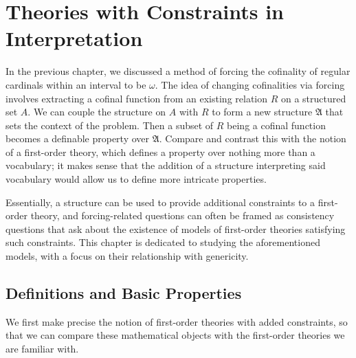 \documentclass[12pt, twoside]{memoir}
\numberwithin{equation}{section}
\theoremstyle{definition}
\theoremstyle{remark}
\theoremstyle{definition}
\theoremstyle{definition}
\theoremstyle{definition}
\theoremstyle{remark}
\begin{document}
\chapter{Theories with Constraints in Interpretation}\label{TCIsec}

In the previous chapter, we discussed a method of forcing the cofinality of regular cardinals within an interval to be $\omega$. The idea of changing cofinalities via forcing involves extracting a cofinal function from an existing relation $R$ on a structured set $A$. We can couple the structure on $A$ with $R$ to form a new structure $\mathfrak{A}$ that sets the context of the problem. Then a subset of $R$ being a cofinal function becomes a definable property over $\mathfrak{A}$. Compare and contrast this with the notion of a first-order theory, which defines a property over nothing more than a vocabulary; it makes sense that the addition of a structure interpreting said vocabulary would allow us to define more intricate properties. 

Essentially, a structure can be used to provide additional constraints to a first-order theory, and forcing-related questions can often be framed as consistency questions that ask about the existence of models of first-order theories satisfying such constraints. This chapter is dedicated to studying the aforementioned models, with a focus on their relationship with genericity.

\section{Definitions and Basic Properties}\label{subs51}

We first make precise the notion of first-order theories with added constraints, so that we can compare these mathematical objects with the first-order theories we are familiar with. 
\end{document}
